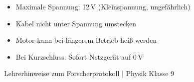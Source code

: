 \documentclass[11pt, a4paper]{article}
\begin{document}

\begin{warnbox}[Sicherheitshinweise]
\begin{itemize}[noitemsep]
    \item Maximale Spannung: 12\,V (Kleinspannung, ungefährlich)
    \item Kabel nicht unter Spannung umstecken
    \item Motor kann bei längerem Betrieb heiß werden
    \item Bei Kurzschluss: Sofort Netzgerät auf 0\,V
\end{itemize}
\end{warnbox}

\vfill

\begin{center}
\small\textcolor{mittelgrau}{Lehrerhinweise zum Forscherprotokoll | Physik Klasse 9}
\end{center}
\end{document}
